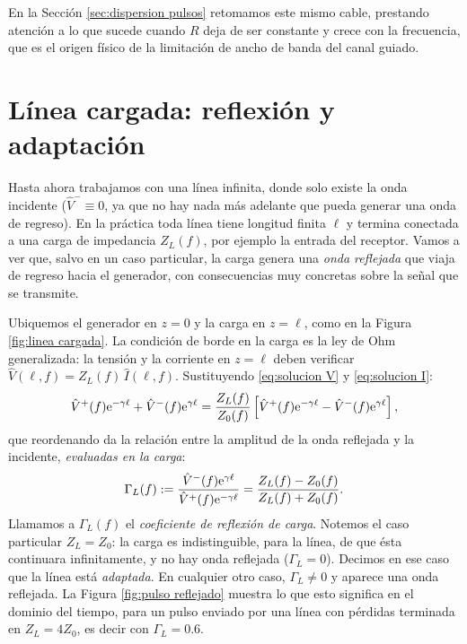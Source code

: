 En la Sección \ref{sec:dispersion pulsos} retomamos este mismo cable, prestando atención a lo que sucede cuando $R$ deja de ser constante y crece con la frecuencia, que es el origen físico de la limitación de ancho de banda del canal guiado.

\section{Línea cargada: reflexión y adaptación}\label{sec:linea cargada}

Hasta ahora trabajamos con una línea infinita, donde solo existe la onda incidente ($\hat V^-\equiv 0$, ya que no hay nada más adelante que pueda generar una onda de regreso). En la práctica toda línea tiene longitud finita $\ell$ y termina conectada a una carga de impedancia $Z_L(f)$, por ejemplo la entrada del receptor. Vamos a ver que, salvo en un caso particular, la carga genera una \emph{onda reflejada} que viaja de regreso hacia el generador, con consecuencias muy concretas sobre la señal que se transmite.

Ubiquemos el generador en $z=0$ y la carga en $z=\ell$, como en la Figura \ref{fig:linea cargada}. La condición de borde en la carga es la ley de Ohm generalizada: la tensión y la corriente en $z=\ell$ deben verificar $\hat V(\ell,f) = Z_L(f)\, \hat I(\ell,f)$. Sustituyendo \eqref{eq:solucion V} y \eqref{eq:solucion I}:
\begin{equation*}
    \hat{V}^+(f)\mathrm{e}^{-\gamma\ell} + \hat{V}^-(f)\mathrm{e}^{\gamma\ell} = \frac{Z_L(f)}{Z_0(f)}\left[\hat{V}^+(f)\mathrm{e}^{-\gamma\ell} - \hat{V}^-(f)\mathrm{e}^{\gamma\ell}\right],
\end{equation*}
que reordenando da la relación entre la amplitud de la onda reflejada y la incidente, \emph{evaluadas en la carga}:
\begin{equation}\label{eq:gamma L}
    \Gamma_L(f) := \frac{\hat{V}^-(f)\mathrm{e}^{\gamma\ell}}{\hat{V}^+(f)\mathrm{e}^{-\gamma\ell}} = \frac{Z_L(f)-Z_0(f)}{Z_L(f)+Z_0(f)}.
\end{equation}
Llamamos a $\Gamma_L(f)$ el \emph{coeficiente de reflexión de carga}. Notemos el caso particular $Z_L=Z_0$: la carga es indistinguible, para la línea, de que ésta continuara infinitamente, y no hay onda reflejada ($\Gamma_L=0$). Decimos en ese caso que la línea está \emph{adaptada}. En cualquier otro caso, $\Gamma_L\neq 0$ y aparece una onda reflejada. La Figura \ref{fig:pulso reflejado} muestra lo que esto significa en el dominio del tiempo, para un pulso enviado por una línea con pérdidas terminada en $Z_L=4Z_0$, es decir con $\Gamma_L=0.6$.

